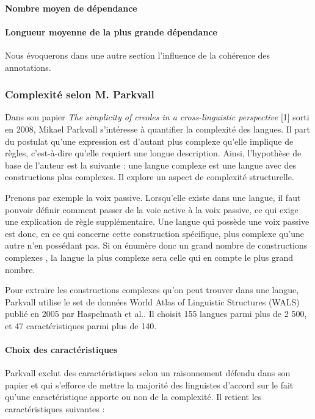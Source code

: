 \documentclass[a4paper, twoside]{article}
\begin{document}
    \paragraph{Nombre moyen de dépendance}

    \paragraph{Longueur moyenne de la plus grande dépendance}

    Nous évoquerons dans une autre section l'influence de la cohérence des annotations.

    \subsubsection{Complexité selon M. Parkvall}

    Dans son papier \textit{The simplicity of creoles in a cross-linguistic perspective} [1] sorti en 2008, Mikael Parkvall s’intéresse à quantifier la complexité des langues. Il part du postulat qu’une expression est d’autant plus complexe qu’elle implique de règles, c’est-à-dire qu’elle requiert une longue description. Ainsi, l'hypothèse de base de l’auteur est la suivante : une langue complexe est une langue avec des constructions plus complexes. Il explore un aspect de complexité structurelle.

    Prenons par exemple la voix passive. Lorsqu’elle existe dans une langue, il faut pouvoir définir comment passer de la voie active à la voix passive, ce qui exige une explication de règle supplémentaire. Une langue qui possède une voix passive est donc, en ce qui concerne cette construction spécifique, plus complexe qu’une autre n’en possédant pas. Si on énumère donc un grand nombre de \og constructions complexes \fg{}, la langue la plus complexe sera celle qui en compte le plus grand nombre.

    Pour extraire les \og constructions complexes \fg{} qu’on peut trouver dans une langue, Parkvall utilise le set de données World Atlas of Linguistic Structures (WALS) publié en 2005 par Haspelmath et al.. Il choisit 155 langues parmi plus de 2 500, et 47 caractéristiques parmi plus de 140.

    \paragraph{Choix des caractéristiques}

    Parkvall exclut des caractéristiques selon un raisonnement défendu dans son papier et qui s’efforce de mettre la majorité des linguistes d’accord sur le fait qu’une caractéristique apporte ou non de la complexité. Il retient les caractéristiques suivantes : \par
\end{document}

